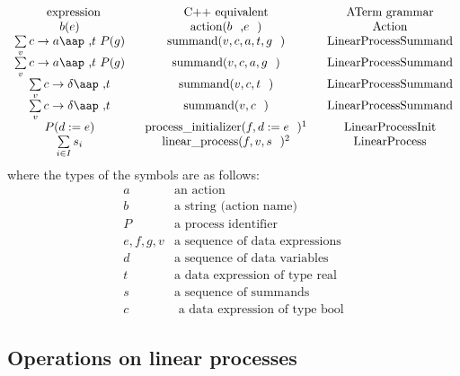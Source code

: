 \documentclass{article}
\begin{document}
\[
\begin{array}{ccc}
\text{expression} & \text{C++ equivalent} & \text{ATerm grammar} \\ 
b(e) & \text{action(}b\text{,}e\text{)} & \text{Action} \\ 
\sum\limits_{v}c\rightarrow a\mbox{\aap ,}t\ P(g) & \text{summand(}v,c,a,t,g%
\text{)} & \text{LinearProcessSummand} \\ 
\sum\limits_{v}c\rightarrow a\mbox{\aap ,}t\ P(g) & \text{summand(}v,c,a,g%
\text{)} & \text{LinearProcessSummand} \\ 
\sum\limits_{v}c\rightarrow \delta \mbox{\aap ,}t & \text{summand(}v,c,t%
\text{)} & \text{LinearProcessSummand} \\ 
\sum\limits_{v}c\rightarrow \delta \mbox{\aap ,}t & \text{summand(}v,c\text{)%
} & \text{LinearProcessSummand} \\ 
P(d:=e) & \text{process\_initializer(}f,d:=e\text{)\QQfnmark{%
Here $f$ is a superset of the free variables appearing in $e$.}} & \text{%
LinearProcessInit} \\ 
\sum\limits_{i\in I}s_{i} & \text{linear\_process(}f,v,s\text{)\QQfnmark{%
Here $s=[s_{1},\cdots ,s_{n}]$ is a sequence of summands, $v$ is the
sequence of process parameters of the corresponding process, and $f$ is a
sequence of free variables appearing in $s$.}} & \text{LinearProcess}%
\end{array}%
\QQfntext{-1}{
Here $f$ is a superset of the free variables appearing in $e$.}
\QQfntext{1}{
Here $s=[s_{1},\cdots ,s_{n}]$ is a sequence of summands, $v$ is the
sequence of process parameters of the corresponding process, and $f$ is a
sequence of free variables appearing in $s$.}
\]%
where the types of the symbols are as follows:%
\[
\begin{array}{cl}
a & \text{an action} \\ 
b & \text{a string (action name)} \\ 
P & \text{a process identifier} \\ 
e,f,g,v & \text{a sequence of data expressions} \\ 
d & \text{a sequence of data variables} \\ 
t & \text{a data expression of type real} \\ 
s & \text{a sequence of summands} \\ 
c & \text{ a data expression of type bool}%
\end{array}%
\]%
\pagebreak 

\subsection{Operations on linear processes}
\end{document}
